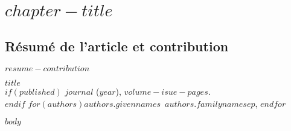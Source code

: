 \graphicspath{{manuscript/}{\chapter1/manuscript/}}

\chapter{\textbf{$chapter-title$}}

\section{Résumé de l'article et contribution}

$resume-contribution$

\vfill{}
\pagebreak

\begin{center}
\textbf{$title$} \\
$if(published)$
\textit{$journal$} ($year$), $volume-isue-pages$. \\
$endif$
$for(authors)$$authors.givennames$~$authors.familyname$$sep$, $endfor$
\end{center}

$body$

\singlespacing
{\renewcommand{\bibname}{References}
\renewcommand{\bibsection}{\section{\bibname}}
}
